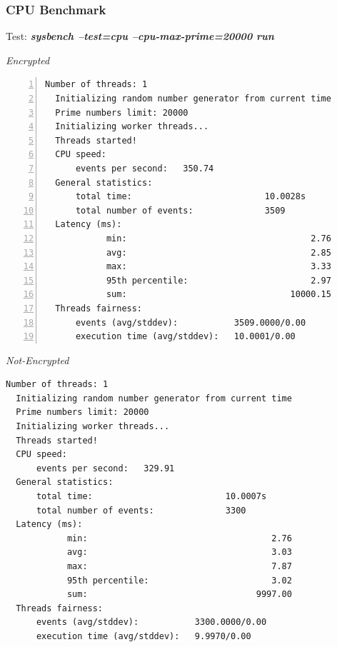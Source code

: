 \subsubsection{CPU Benchmark}
\begin{center}
  Test: \textbf{\textit{sysbench --test=cpu --cpu-max-prime=20000 run}}  
\end{center}
\vspace*{-\baselineskip}
\noindent\begin{minipage}[t]{0.45\linewidth}
  \centering
  \textit{Encrypted}
  \lstset{language=bash,label=SliceExaple}
  \begin{lstlisting}[basicstyle=\tiny,frame=single, numbers=left, label=cpu_test1]
  Number of threads: 1
  Initializing random number generator from current time
  Prime numbers limit: 20000
  Initializing worker threads...
  Threads started!
  CPU speed:
      events per second:   350.74
  General statistics:
      total time:                          10.0028s
      total number of events:              3509
  Latency (ms):
            min:                                    2.76
            avg:                                    2.85
            max:                                    3.33
            95th percentile:                        2.97
            sum:                                10000.15
  Threads fairness:
      events (avg/stddev):           3509.0000/0.00
      execution time (avg/stddev):   10.0001/0.00
  \end{lstlisting}
\end{minipage}
\hspace{0.5cm}
\noindent\begin{minipage}[t]{0.45\linewidth}
  \centering
  \textit{Not-Encrypted}
  \begin{lstlisting}[basicstyle=\tiny,frame=single, label=cpu_test2]
  Number of threads: 1
  Initializing random number generator from current time
  Prime numbers limit: 20000
  Initializing worker threads...
  Threads started!
  CPU speed:
      events per second:   329.91
  General statistics:
      total time:                          10.0007s
      total number of events:              3300
  Latency (ms):
            min:                                    2.76
            avg:                                    3.03
            max:                                    7.87
            95th percentile:                        3.02
            sum:                                 9997.00
  Threads fairness:
      events (avg/stddev):           3300.0000/0.00
      execution time (avg/stddev):   9.9970/0.00
  \end{lstlisting}
\end{minipage}

